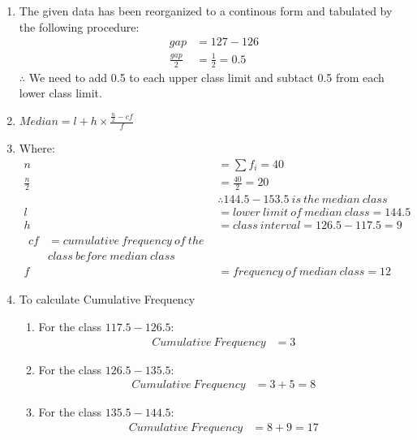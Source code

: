 \renewcommand{\theequation}{\theenumi}

\begin{enumerate}

\item The given data has been reorganized to a continous form and tabulated by the following procedure:
\begin{align*}
gap &= 127-126\\
\frac{gap}{2} &= \frac{1}{2} = 0.5 
\end{align*}
$\therefore$ We need to add 0.5 to each upper class limit and subtact 0.5 from each lower class limit. 

\item $Median = l + h \times \frac{\frac{n}{2} - cf}{f} $

\item Where:
\begin{align*}
n &= \sum f_i = 40 \\
\frac{n}{2} &= \frac{40}{2} = 20\\
&\therefore 144.5-153.5\ is\ the\ median\ class\\
l &= lower\ limit\ of\ median\ class = 144.5\\
h &= class\ interval = 126.5 - 117.5 = 9 \\
\begin{split}
cf &= cumulative\ frequency\ of\ the \\
&class\ before\ median\ class 
\end{split}\\
f &= frequency\ of\ median\ class = 12
\end{align*}

\item To calculate Cumulative Frequency 
\begin{enumerate}

\item For the class $117.5-126.5$:
\begin{align*}
Cumulative\ Frequency &= 3
\end{align*}

\item For the class $126.5-135.5$:
\begin{align*}
Cumulative\ Frequency &= 3 + 5 = 8
\end{align*}

\item For the class $135.5-144.5$:
\begin{align*}
Cumulative\ Frequency &= 8 + 9 = 17 
\end{align*}


\end{enumerate}
\end{enumerate}
